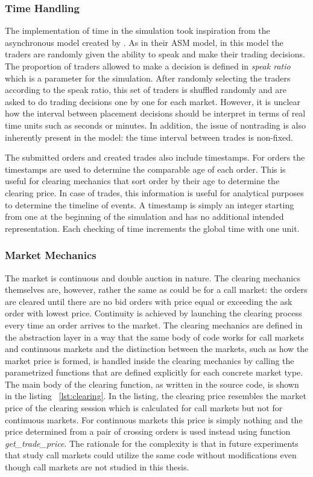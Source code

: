 \subsubsection{Time Handling}

The implementation of time in the simulation took inspiration from the asynchronous model created by \citet{Julien07}. 
As in their ASM model, in this model the traders are randomly given the ability to speak and make 
their trading decisions. The proportion of traders allowed to make a decision is defined in
\textit{speak ratio} which is a parameter for the simulation. After randomly selecting the traders
according to the speak ratio, this set of traders is shuffled randomly and are asked to do trading 
decisions one by one for each market. However, it is unclear how the interval between placement 
decisions should be interpret in terms of real time units such as seconds or minutes. In addition, 
the issue of nontrading is also inherently present in the model: the time interval between trades 
is non-fixed.

The submitted orders and created trades also include timestamps. For orders the timestamps are used
to determine the comparable age of each order. This is useful for clearing mechanics that sort 
order by their age to determine the clearing price. In case of trades, this information
is useful for analytical purposes to determine the timeline of events. A timestamp is simply 
an integer starting from one at the beginning of the simulation and has no additional 
intended representation. Each checking of time increments the global time with one unit.

\subsubsection{Market Mechanics}

The market is continuous and double auction in nature.
The clearing mechanics themselves are, however, 
rather the same as could be for a call market: 
the orders are cleared until there
are no bid orders with price equal or exceeding the
ask order with lowest price. 
Continuity is achieved by launching the clearing process
every time an order arrives to the market. 
The clearing mechanics are defined in 
the abstraction layer in a way that the same body
of code works for call markets and continuous markets
and the distinction between the markets, such as how 
the market price is formed, is handled inside the clearing
mechanics by calling the parametrized functions that are 
defined explicitly for each concrete market type. 
The main body of the clearing function, 
as written in the source code, is shown in the listing ~\ref{lst:clearing}.
In the listing, the clearing price resembles the market price
of the clearing session which is calculated for call markets but not for 
continuous markets. For continuous markets this price is simply nothing and
the price determined from a pair of crossing orders is used instead using function
\emph{get\_trade\_price}. The rationale for the complexity is that in future experiments
that study call markets could utilize the same code without modifications 
even though call markets are not studied in this thesis.

